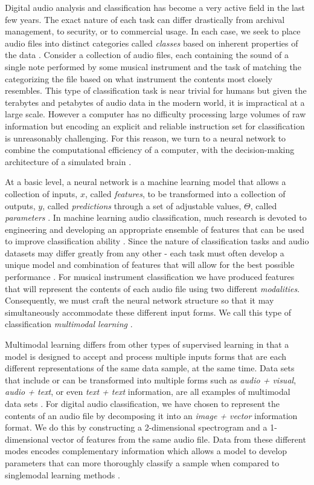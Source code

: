 \documentclass[conference,onecolumn,letterpaper]{IEEEtran}
\begin{document}
Digital audio analysis and classification has become a very active field in the last few years. The exact nature of each task can differ drastically from archival management, to security, or to commercial usage. In each case, we seek to place audio files into distinct categories called \textit{classes} based on inherent properties of the data \cite{James,Khan,Liu}. Consider a collection of audio files, each containing the sound of a single note performed by some musical instrument and the task of matching the categorizing the file based on what instrument the contents most closely resembles. This type of classification task is near trivial for humans but given the terabytes and petabytes of audio data in the modern world, it is impractical at a large scale. However a computer has no difficulty processing large volumes of raw information but encoding an explicit and reliable instruction set for classification is unreasonably challenging. For this reason, we turn to a neural network to combine the computational efficiency of a computer, with the decision-making architecture of a simulated brain \cite{Geron}. 

At a basic level, a neural network is a machine learning model that allows a collection of inputs, $x$, called \textit{features}, to be transformed into a collection of outputs, $y$,  called \textit{predictions} through a set of adjustable values, $\Theta$, called \textit{parameters} \cite{Geron,Goodfellow,Virtanen}. In machine learning audio classification, much research is devoted to engineering and developing an appropriate ensemble of features that can be used to improve classification ability \cite{James,Liu,Mierswa,Zhang}. Since the nature of classification tasks and audio datasets may differ greatly from any other - each task must often develop a unique model and combination of features that will allow for the best possible performance \cite{Virtanen}. For musical instrument classification we have produced features that will represent the contents of each audio file using two different \textit{modalities}. Consequently, we must craft the neural network structure so that it may simultaneously accommodate these different input forms. We call this type of classification \textit{multimodal learning} \cite{Ngiam}.

Multimodal learning differs from other types of supervised learning in that a model is designed to accept and process multiple inputs forms that are each different representations of the same data sample, at the same time. Data sets that include or can be transformed into multiple forms such as \textit{audio + visual}, \textit{audio + text}, or even \textit{text + text} information, are all examples of multimodal data sets \cite{Li}. For digital audio classification, we have chosen to represent the contents of an audio file by decomposing it into an \textit{image + vector} information format. We do this by constructing a 2-dimensional spectrogram and a 1-dimensional vector of features from the same audio file. Data from these different modes encodes complementary information which allows a model to develop parameters that can more thoroughly classify a sample when compared to singlemodal learning methods \cite{Li}.
\end{document}

